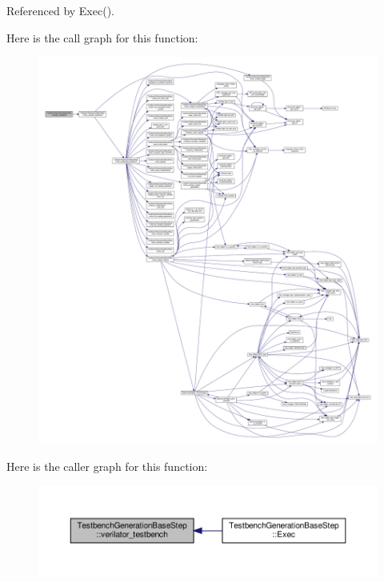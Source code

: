 Referenced by Exec().

Here is the call graph for this function\+:
\nopagebreak
\begin{figure}[H]
\begin{center}
\leavevmode
\includegraphics[width=350pt]{dc/d02/classTestbenchGenerationBaseStep_a5df6c949ea78186f4c6a47f80e68aa3e_cgraph}
\end{center}
\end{figure}
Here is the caller graph for this function\+:
\nopagebreak
\begin{figure}[H]
\begin{center}
\leavevmode
\includegraphics[width=350pt]{dc/d02/classTestbenchGenerationBaseStep_a5df6c949ea78186f4c6a47f80e68aa3e_icgraph}
\end{center}
\end{figure}
\mbox{\label{classTestbenchGenerationBaseStep_ae51ed1b581d6afe1f5826f767668687c}} 

